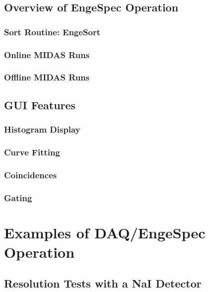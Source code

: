 \subsection{Overview of EngeSpec Operation}

\subsubsection{Sort Routine: EngeSort}

\subsubsection{Online MIDAS Runs}

\subsubsection{Offline MIDAS Runs}

\subsection{GUI Features}

\subsubsection{Histogram Display}

\subsubsection{Curve Fitting}

\subsubsection{Coincidences}

\subsubsection{Gating}


\pagebreak
\section{Examples of DAQ/EngeSpec Operation}

\subsection{Resolution Tests with a NaI Detector} \label{resolution}

